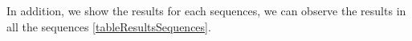 \begin{table}[H]
\centering

\caption{Results of our algorithm.}
\label{tableResults}
\end{table}






In addition, we show the results for each sequences, we can observe the results in all the sequences \ref{tableResultsSequences}. 





